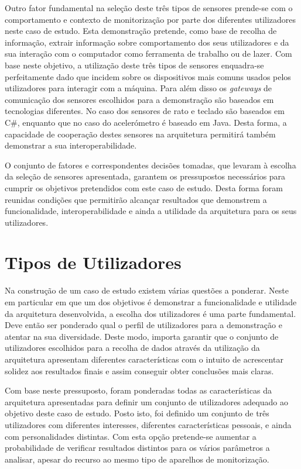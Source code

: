 Outro fator fundamental na seleção deste três tipos de sensores prende-se com o comportamento e contexto de monitorização por parte dos diferentes utilizadores neste caso de estudo. Esta demonstração pretende, como base de recolha de informação, extrair informação sobre comportamento dos seus utilizadores e da sua interação com o computador como ferramenta de trabalho ou de lazer. Com base neste objetivo, a utilização deste três tipos de sensores enquadra-se perfeitamente dado que incidem sobre os dispositivos mais comuns usados pelos utilizadores para interagir com a máquina. Para além disso os \textit{gateways} de comunicação dos sensores escolhidos para a demonstração são baseados em tecnologias diferentes. No caso dos sensores de rato e teclado são baseados em C\#, enquanto que no caso do acelerómetro é baseado em Java. Desta forma, a capacidade de cooperação destes sensores na arquitetura permitirá também demonstrar a sua interoperabilidade.

O conjunto de fatores e correspondentes decisões tomadas, que levaram à escolha da seleção de sensores apresentada, garantem os pressupostos necessários para cumprir os objetivos pretendidos com este caso de estudo. Desta forma foram reunidas condições que permitirão alcançar resultados que demonstrem a funcionalidade, interoperabilidade e ainda a utilidade da arquitetura para os seus utilizadores.

\section{Tipos de Utilizadores}

Na construção de um caso de estudo existem várias questões a ponderar. Neste em particular em que um dos objetivos é demonstrar a funcionalidade e utilidade da arquitetura desenvolvida, a escolha dos utilizadores é uma parte fundamental. Deve então ser ponderado qual o perfil de utilizadores para a demonstração e atentar na sua diversidade. Deste modo, importa garantir que o conjunto de utilizadores escolhidos para a recolha de dados através da utilização da arquitetura apresentam diferentes características com o intuito de acrescentar solidez aos resultados finais e assim conseguir obter conclusões mais claras.

Com base neste pressuposto, foram ponderadas todas as características da arquitetura apresentadas para definir um conjunto de utilizadores adequado ao objetivo deste caso de estudo. Posto isto, foi definido um conjunto de três utilizadores com diferentes interesses, diferentes características pessoais, e ainda com personalidades distintas. Com esta opção pretende-se aumentar a probabilidade de verificar resultados distintos para os vários parâmetros a analisar, apesar do recurso ao mesmo tipo de aparelhos de monitorização.

